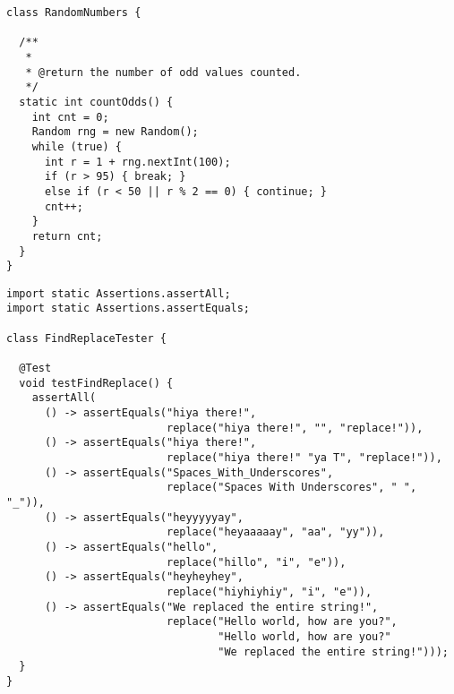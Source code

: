 \begin{lstlisting}[language=MyJava]
class RandomNumbers {

  /**
   * 
   * @return the number of odd values counted.
   */
  static int countOdds() {
    int cnt = 0;
    Random rng = new Random();
    while (true) {
      int r = 1 + rng.nextInt(100);
      if (r > 95) { break; }
      else if (r < 50 || r % 2 == 0) { continue; }
      cnt++;
    }
    return cnt;
  }
}
\end{lstlisting}


\begin{lstlisting}[language=MyJava]
import static Assertions.assertAll;
import static Assertions.assertEquals;

class FindReplaceTester {

  @Test
  void testFindReplace() {
    assertAll(
      () -> assertEquals("hiya there!",
                         replace("hiya there!", "", "replace!")),
      () -> assertEquals("hiya there!",
                         replace("hiya there!" "ya T", "replace!")),
      () -> assertEquals("Spaces_With_Underscores",
                         replace("Spaces With Underscores", " ", "_")),
      () -> assertEquals("heyyyyyay",
                         replace("heyaaaaay", "aa", "yy")),
      () -> assertEquals("hello",
                         replace("hillo", "i", "e")),
      () -> assertEquals("heyheyhey",
                         replace("hiyhiyhiy", "i", "e")),
      () -> assertEquals("We replaced the entire string!",
                         replace("Hello world, how are you?", 
                                 "Hello world, how are you?" 
                                 "We replaced the entire string!")));
  }
}
\end{lstlisting}

